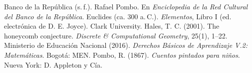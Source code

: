 \documentclass[11pt]{article}
\begin{document}
\begin{referencias}
 Banco de la República (s.\,f.). Rafael Pombo. En \emph{Enciclopedia de
  la Red Cultural del Banco de la República}.
 Euclides (ca. 300 a.\,C.). \emph{Elementos}, Libro I (ed. electrónica
  de D. E. Joyce). Clark University.
 Hales, T. C. (2001). The honeycomb conjecture.
  \emph{Discrete \& Computational Geometry}, 25(1), 1--22.
 Ministerio de Educación Nacional (2016). \emph{Derechos
  Básicos de Aprendizaje V.2: Matemáticas}. Bogotá: MEN.
 Pombo, R. (1867). \emph{Cuentos pintados para niños}.
  Nueva York: D. Appleton y Cía.
\end{referencias}
\end{document}
